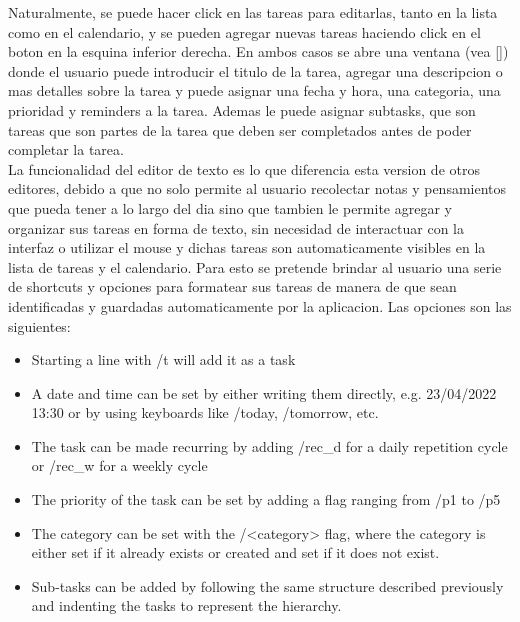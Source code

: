 Naturalmente, se puede hacer click en las tareas para editarlas, tanto en la lista como en el calendario, y se pueden agregar nuevas tareas haciendo click en el boton en la esquina inferior derecha. En ambos casos se abre una ventana (vea \ref{}) donde el usuario puede introducir el titulo de la tarea, agregar una descripcion o mas detalles sobre la tarea y puede asignar una fecha y hora, una categoria, una prioridad y reminders a la tarea. Ademas le puede asignar subtasks, que son tareas que son partes de la tarea que deben ser completados antes de poder completar la tarea.\\
La funcionalidad del editor de texto es lo que diferencia esta version de otros editores, debido a que no solo permite al usuario recolectar notas y pensamientos que pueda tener a lo largo del dia sino que tambien le permite agregar y organizar sus tareas en forma de texto, sin necesidad de interactuar con la interfaz o utilizar el mouse y dichas tareas son automaticamente visibles en la lista de tareas y el calendario. Para esto se pretende brindar al usuario una serie de shortcuts y opciones para formatear sus tareas de manera de que sean identificadas y guardadas automaticamente por la aplicacion. Las opciones son las siguientes: 

\begin{itemize}
    \item Starting a line with /t will add it as a task
    \item A date and time can be set by either writing them directly, e.g. 23/04/2022 13:30 or by using keyboards like /today, /tomorrow, etc.
    \item The task can be made recurring by adding /rec\_d for a daily repetition cycle or /rec\_w for a weekly cycle
    \item The priority of the task can be set by adding a flag ranging from /p1 to /p5
    \item The category can be set with the /<category> flag, where the category is either set if it already exists or created and set if it does not exist. 
    \item Sub-tasks can be added by following the same structure described previously and indenting the tasks to represent the hierarchy. 
\end{itemize}

